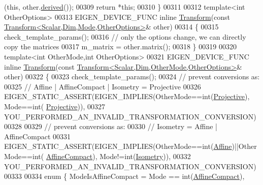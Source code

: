 \begin{DoxyCode}
      (\textcolor{keyword}{this}, other.\hyperlink{group___core___module_a324b16961a11d2ecfd2d1b7dd7946545}{derived}());
00309     \textcolor{keywordflow}{return} *\textcolor{keyword}{this};
00310   \}
00311   
00312   \textcolor{keyword}{template}<\textcolor{keywordtype}{int} OtherOptions>
00313   EIGEN\_DEVICE\_FUNC \textcolor{keyword}{inline} \hyperlink{group___geometry___module_class_eigen_1_1_transform}{Transform}(\textcolor{keyword}{const} 
      \hyperlink{group___geometry___module_class_eigen_1_1_transform}{Transform<Scalar,Dim,Mode,OtherOptions>}& other)
00314   \{
00315     check\_template\_params();
00316     \textcolor{comment}{// only the options change, we can directly copy the matrices}
00317     m\_matrix = other.matrix();
00318   \}
00319 
00320   \textcolor{keyword}{template}<\textcolor{keywordtype}{int} OtherMode,\textcolor{keywordtype}{int} OtherOptions>
00321   EIGEN\_DEVICE\_FUNC \textcolor{keyword}{inline} \hyperlink{group___geometry___module_class_eigen_1_1_transform}{Transform}(\textcolor{keyword}{const} 
      \hyperlink{group___geometry___module_class_eigen_1_1_transform}{Transform<Scalar,Dim,OtherMode,OtherOptions>}& other)
00322   \{
00323     check\_template\_params();
00324     \textcolor{comment}{// prevent conversions as:}
00325     \textcolor{comment}{// Affine | AffineCompact | Isometry = Projective}
00326     EIGEN\_STATIC\_ASSERT(EIGEN\_IMPLIES(OtherMode==\textcolor{keywordtype}{int}(\hyperlink{group__enums_ggaee59a86102f150923b0cac6d4ff05107aead6a2de12a17aaa4f5c523215dfccad}{Projective}), Mode==\textcolor{keywordtype}{int}(
      \hyperlink{group__enums_ggaee59a86102f150923b0cac6d4ff05107aead6a2de12a17aaa4f5c523215dfccad}{Projective})),
00327                         YOU\_PERFORMED\_AN\_INVALID\_TRANSFORMATION\_CONVERSION)
00328 
00329     \textcolor{comment}{// prevent conversions as:}
00330     \textcolor{comment}{// Isometry = Affine | AffineCompact}
00331     EIGEN\_STATIC\_ASSERT(EIGEN\_IMPLIES(OtherMode==\textcolor{keywordtype}{int}(\hyperlink{group__enums_ggaee59a86102f150923b0cac6d4ff05107a71e768e0581725d919d0b05f4cb83234}{Affine})||OtherMode==\textcolor{keywordtype}{int}(
      \hyperlink{group__enums_ggaee59a86102f150923b0cac6d4ff05107aa30a06b60d218b709020972df47de2b0}{AffineCompact}), Mode!=\textcolor{keywordtype}{int}(\hyperlink{group__enums_ggaee59a86102f150923b0cac6d4ff05107a080cd5366173608f701cd945c2335568}{Isometry})),
00332                         YOU\_PERFORMED\_AN\_INVALID\_TRANSFORMATION\_CONVERSION)
00333 
00334     \textcolor{keyword}{enum} \{ ModeIsAffineCompact = Mode == int(\hyperlink{group__enums_ggaee59a86102f150923b0cac6d4ff05107aa30a06b60d218b709020972df47de2b0}{AffineCompact}),

\end{DoxyCode}
